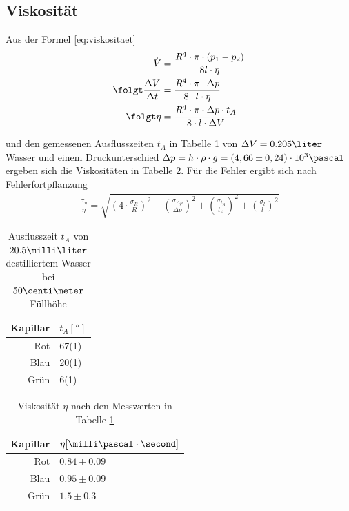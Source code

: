 \documentclass[12pt, a4paper, twoside]{scrartcl}
\begin{document}
\subsection{Viskosität}

Aus der Formel \eqref{eq:viskositaet}
\begin{align}
 \dot V&=\frac{R^{4}\cdot\pi\cdot(p_1-p_2)}{8l\cdot\eta} \nonumber \\
 \folgt \frac{\Delta V}{\Delta t} &= \frac{R^{4}\cdot\pi\cdot\Delta p}{8\cdot l\cdot\eta} \nonumber \\
 \folgt \eta &= \frac{R^{4}\cdot\pi\cdot\Delta p\cdot t_A}{8\cdot l\cdot\Delta V}
\end{align}

und den gemessenen Ausflusszeiten $t_A$ in Tabelle \ref{tab:t_A} von $\Delta V=0.205 \liter$ Wasser und einem Druckunterschied $\Delta p = h\cdot\rho\cdot g = (4,66\pm0,24)\cdot 10^{3} \pascal$ ergeben sich die Viskositäten in Tabelle \ref{tab:eta}.
Für die Fehler ergibt sich nach Fehlerfortpflanzung
\begin{align}
  \frac{\sigma_\eta}{\eta} = \sqrt{\left(4\cdot\frac{\sigma_{R}}{R}\right)^2 + \left(\frac{\sigma_{\Delta p}}{\Delta p}\right)^2 + \left(\frac{\sigma_{t_A}}{t_A}\right) ^2 + \left(\frac{\sigma_{l}}{l}\right)^2}  \nonumber
\end{align}

\begin{table}[!h]
\centering
\begin{tabular}{r|l}
    Kapillar & $t_A [\second]$\\
    \hline
    Rot & 67(1)\\
    Blau & 20(1)\\
    Grün & 6(1)\\
    
 \end{tabular} 
 \caption{\label{tab:t_A}Ausflusszeit $t_A$ von $20.5\milli\liter$ destilliertem Wasser bei $50\centi\meter$ Füllhöhe}
\end{table}

\begin{table}[!h]
\centering
\begin{tabular}{r|l}
    Kapillar & $\eta [\milli\pascal\cdot\second]$\\
    \hline
    Rot & $0.84\pm0.09$\\
    Blau & $0.95\pm0.09$\\
    Grün & $1.5\pm0.3$\\
    
 \end{tabular} 
 \caption{\label{tab:eta}Viskosität $\eta$ nach den Messwerten in Tabelle \ref{tab:t_A}}
\end{table}
\end{document}
